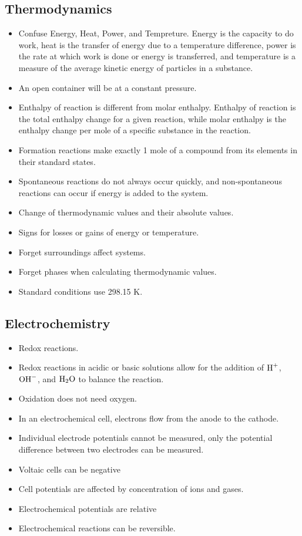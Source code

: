     \subsection{Thermodynamics}
        \begin{itemize}
            \item Confuse Energy, Heat, Power, and Tempreture. Energy is the capacity to do work, heat is the transfer of energy due to a temperature difference, power is the rate at which work is done or energy is transferred, and temperature is a measure of the average kinetic energy of particles in a substance.
            \item An open container will be at a constant pressure.
            \item Enthalpy of reaction is different from molar enthalpy. Enthalpy of reaction is the total enthalpy change for a given reaction, while molar enthalpy is the enthalpy change per mole of a specific substance in the reaction.
            \item Formation reactions make exactly 1 mole of a compound from its elements in their standard states.
            \item Spontaneous reactions do not always occur quickly, and non-spontaneous reactions can occur if energy is added to the system.
            \item Change of thermodynamic values and their absolute values. 
            \item Signs for losses or gains of energy or temperature.
            \item Forget surroundings affect systems.
            \item Forget phases when calculating thermodynamic values.
            \item Standard conditions use 298.15 K. 
        \end{itemize}
    \subsection{Electrochemistry}
        \begin{itemize}
            \item Redox reactions.
            \item Redox reactions in acidic or basic solutions allow for the addition of $\ce{H+}$, $\ce{OH-}$, and $\ce{H2O}$ to balance the reaction.
            \item Oxidation does not need oxygen.
            \item In an electrochemical cell, electrons flow from the anode to the cathode.
            \item Individual electrode potentials cannot be measured, only the potential difference between two electrodes can be measured.
            \item Voltaic cells can be negative
            \item Cell potentials are affected by concentration of ions and gases.
            \item Electrochemical potentials are relative
            \item Electrochemical reactions can be reversible.
        \end{itemize}
